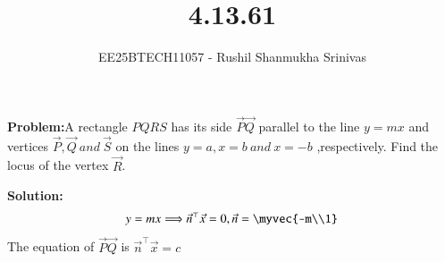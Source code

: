 \documentclass[journal]{IEEEtran}
\begin{document}




\title{4.13.61}
\author{EE25BTECH11057 - Rushil Shanmukha Srinivas
}
{\let\newpage\relax\maketitle}

\renewcommand{\thefigure}{\theenumi}
\renewcommand{\thetable}{\theenumi}
\setlength{\intextsep}{10pt} %

\renewcommand{\thetable}{\theenumi}

\textbf{Problem:}A rectangle $PQRS$ has its side $\vec{P}\vec{Q}$ parallel to the line $y = mx$ and vertices $\vec{P}, \vec{Q} \ and \ \vec{S}$ on the lines $y = a, x = b \ and \ x = -b $ ,respectively. Find the locus of the vertex $\vec{R}$.

\textbf{Solution:}
\begin{align}
y=mx \Longrightarrow \vec{n}^\top\vec{x}=0,\vec{n}=\myvec{-m\\1}
\end{align}
The equation of $\vec{P}\vec{Q}$ is $\vec{n}^\top\vec{x}=c$
\end{document}
